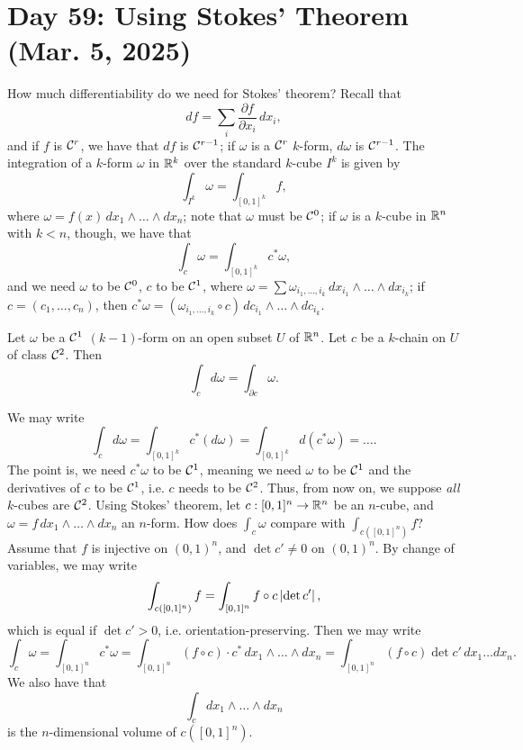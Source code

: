 \section{Day 59: Using Stokes' Theorem (Mar. 5, 2025)}
How much differentiability do we need for Stokes' theorem? Recall that
\[ df = \sum_i \frac{\partial f}{\partial x_i} \, dx_i, \]
and if $f$ is $\mathcal C^r$, we have that $df$ is $\mathcal C^{r-1}$; if $\omega$ is a $\mathcal C^r$ $k$-form, $d\omega$ is $\mathcal C^{r-1}$. The integration of a $k$-form $\omega$ in $\mathbb R^k$ over the standard $k$-cube $I^k$ is given by
\[ \int_{I^k} \omega = \int_{[0, 1]^k} f, \]
where $\omega = f(x) \, dx_1 \wedge \dots \wedge dx_n$; note that $\omega$ must be $\mathcal C^0$; if $\omega$ is a $k$-cube in $\mathbb R^n$ with $k < n$, though, we have that
\[ \int_c \omega = \int_{[0, 1]^k} c^\ast \omega, \]
and we need $\omega$ to be $\mathcal C^0$, $c$ to be $\mathcal C^1$, where $\omega = \sum \omega_{i_1, \dots, i_k} \, dx_{i_1} \wedge \dots \wedge dx_{i_k}$; if $c = (c_1, \dots, c_n)$, then $c^\ast \omega = (\omega_{i_1, \dots, i_k} \circ c) \, dc_{i_1} \wedge \dots \wedge dc_{i_k}$.
\begin{simplethm}
    Let $\omega$ be a $\mathcal C^1$ $(k-1)$-form on an open subset $U$ of $\mathbb R^n$. Let $c$ be a $k$-chain on $U$ of class $\mathcal C^2$. Then
    \[ \int_c d\omega = \int_{\partial c} \omega. \]
\end{simplethm}
\noindent We may write
\[ \int_c d\omega = \int_{[0, 1]^k} c^\ast(d \omega) = \int_{[0, 1]^k} d(c^\ast \omega) = \dots. \]
The point is, we need $c^\ast \omega$ to be $\mathcal C^1$, meaning we need $\omega$ to be $\mathcal C^1$ and the derivatives of $c$ to be $\mathcal C^1$, i.e. $c$ needs to be $\mathcal C^2$. Thus, from now on, we suppose \textit{all} $k$-cubes are $\mathcal C^2$. Using Stokes' theorem, let $c : [0, 1]^n \to \mathbb R^n$ be an $n$-cube, and $\omega = f \, dx_1 \wedge \dots \wedge dx_n$ an $n$-form. How does $\int_c \omega$ compare with $\int_{c([0, 1]^n)} f$?
\medskip\newline
Assume that $f$ is injective on $(0, 1)^n$, and $\det c' \neq 0$ on $(0, 1)^n$. By change of variables, we may write
\[ \int_{c([0, 1]^n)} f = \int_{[0, 1]^n} f \circ c \left\lvert \det c' \right\rvert, \]
which is equal if $\det c' > 0$, i.e. orientation-preserving. Then we may write
\[ \int_c \omega = \int_{[0, 1]^n} c^\ast \omega = \int_{[0, 1]^n} (f \circ c) \cdot c^\ast \, dx_1 \wedge \dots \wedge dx_n = \int_{[0, 1]^n} (f \circ c) \det c' \, dx_1 \dots dx_n. \]
We also have that
\[ \int_c dx_1 \wedge \dots \wedge dx_n \]
is the $n$-dimensional volume of $c([0, 1]^n)$.
